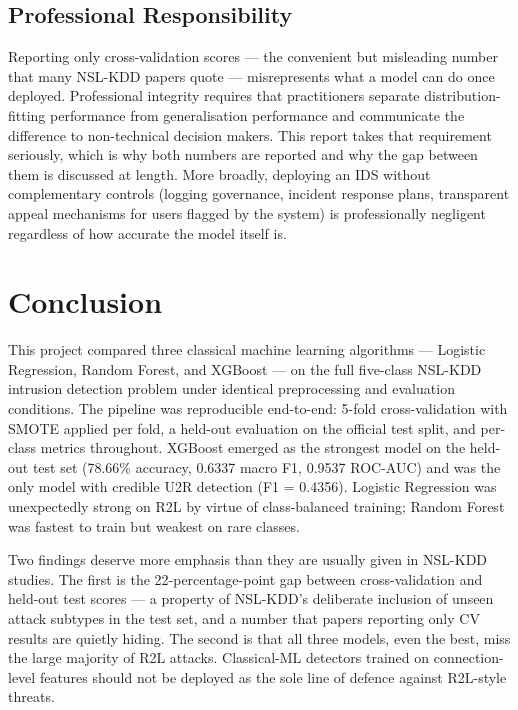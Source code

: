 \documentclass[11pt, a4paper]{article}
\begin{document}
\subsection{Professional Responsibility}
Reporting only cross-validation scores --- the convenient but misleading number that many NSL-KDD papers quote --- misrepresents what a model can do once deployed. Professional integrity requires that practitioners separate distribution-fitting performance from generalisation performance and communicate the difference to non-technical decision makers. This report takes that requirement seriously, which is why both numbers are reported and why the gap between them is discussed at length. More broadly, deploying an IDS without complementary controls (logging governance, incident response plans, transparent appeal mechanisms for users flagged by the system) is professionally negligent regardless of how accurate the model itself is.

\section{Conclusion}
\label{sec:conclusion}

This project compared three classical machine learning algorithms --- Logistic Regression, Random Forest, and XGBoost --- on the full five-class NSL-KDD intrusion detection problem under identical preprocessing and evaluation conditions. The pipeline was reproducible end-to-end: 5-fold cross-validation with SMOTE applied per fold, a held-out evaluation on the official test split, and per-class metrics throughout. XGBoost emerged as the strongest model on the held-out test set (78.66\% accuracy, 0.6337 macro F1, 0.9537 ROC-AUC) and was the only model with credible U2R detection (F1 = 0.4356). Logistic Regression was unexpectedly strong on R2L by virtue of class-balanced training; Random Forest was fastest to train but weakest on rare classes.

Two findings deserve more emphasis than they are usually given in NSL-KDD studies. The first is the 22-percentage-point gap between cross-validation and held-out test scores --- a property of NSL-KDD's deliberate inclusion of unseen attack subtypes in the test set, and a number that papers reporting only CV results are quietly hiding. The second is that all three models, even the best, miss the large majority of R2L attacks. Classical-ML detectors trained on connection-level features should not be deployed as the sole line of defence against R2L-style threats.
\end{document}
